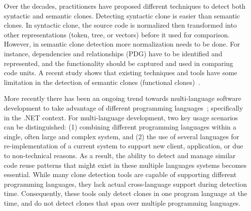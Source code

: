 Over the decades, practitioners have proposed different techniques to detect both syntactic and semantic clones. Detecting syntactic clone is easier than semantic clones. In syntactic clone, the source code is normalized then transformed into other representations (token, tree, or vectors) before it used for comparison. However, in semantic clone detection more normalization needs to be done. For instance, dependencies and relationships (PDG) have to be identified and represented, and the functionality should be captured and used in comparing code units. A recent study shows that existing techniques and tools have some limitation in the detection of semantic clones (functional clones)~\cite{Wagner2016}.   




More recently there has been an ongoing trend towards multi-language software development to take advantage of different programming languages~\cite{Kontogiannis2006}; specifically in the .NET context. For multi-language development, two key usage scenarios can be distinguished: (1) combining different programming languages within a single, often large and complex system, and (2) the use of several languages for re-implementation of a current system to support new client, application, or due to non-technical reasons. As a result, the ability to detect and manage similar code reuse patterns that might exist in these multiple languages systems becomes essential. While many clone detection tools are capable of supporting different programming languages, they lack actual cross-language support during detection time. Consequently, these tools only detect clones in one program language at the time, and do not detect clones that span over multiple programming languages.


